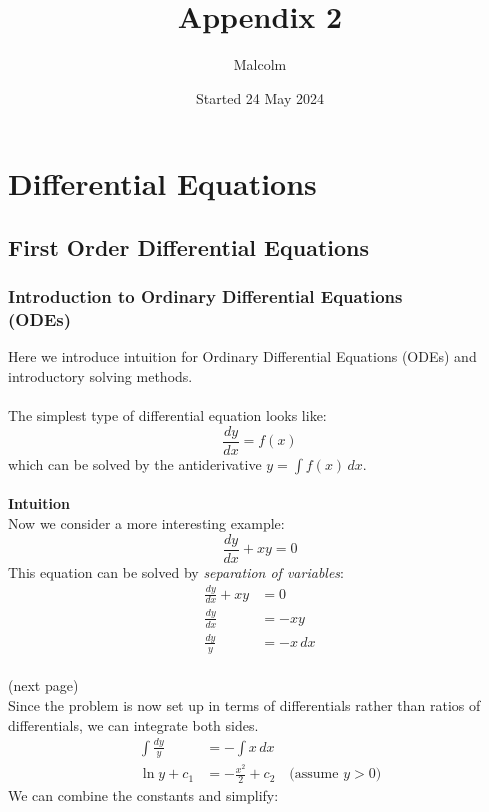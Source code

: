 \documentclass{report}
\title{Appendix 2}
\date{Started 24 May 2024}
\author{Malcolm}
\begin{document}
\maketitle

\tableofcontents

\appendix
\chapter{Differential Equations}
\section{First Order Differential Equations}
\subsection{Introduction to Ordinary Differential Equations\\(ODEs)} %
Here we introduce intuition for  Ordinary Differential Equations (ODEs) and introductory solving methods.\\
\vspace{1mm}\\
The simplest type of differential equation looks like:
\begin{equation*}
\frac{dy}{dx}=f(x)
\end{equation*}
which can be solved by the antiderivative $y=\int f(x)\,dx$. \\
\vspace{1mm}\\
\textbf{Intuition}\\
Now we consider a more interesting example: 
\begin{equation*}
\frac{dy}{dx}+xy=0
\end{equation*}
This equation can be solved by \textit{separation of variables}:
\begin{align*}
\frac{dy}{dx}+xy&=0\\
\frac{dy}{dx}&=-xy\\
\frac{dy}{y}&=-x\,dx
\end{align*}\\
(next page)\\
Since the problem is now set up in terms of differentials rather than ratios of differentials,
we can integrate both sides.
\begin{align*}
\int\frac{dy}{y}&=-\int x\,dx\\
\ln y+c_1&=-\frac{x^2}{2}+c_2\quad\text{(assume $y>0$)}
\end{align*}
We can combine the constants and simplify:
\end{document}
